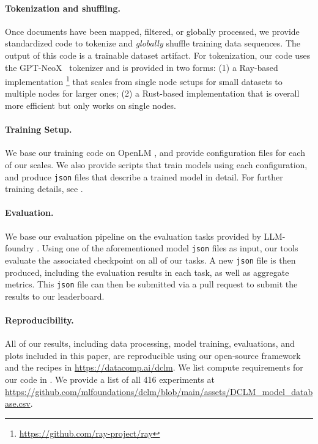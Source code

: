 \documentclass{article}
\newcommand{\numbaseline}{416}
\newcommand{\ourcode}{\url{https://datacomp.ai/dclm}\xspace}
\begin{document}
\paragraph{Tokenization and shuffling.}
Once documents have been mapped, filtered, or globally processed, we provide standardized code to tokenize and \textit{globally} shuffle training data sequences.
The output of this code is a trainable dataset artifact.
For tokenization, our code uses the GPT-NeoX~\citep{neox} tokenizer and is provided in two forms: (1) a Ray-based implementation \footnote{\url{https://github.com/ray-project/ray}} that scales from single node setups for small datasets to multiple nodes for larger ones; (2) a Rust-based implementation that is overall more efficient but only works on single nodes.

\paragraph{Training Setup.} We base our training code on OpenLM \citep{open_lm}, and provide configuration files for each of our scales.
We also provide scripts that train models using each configuration, and produce \texttt{json} files that describe a trained model in detail.
For further training details, see .

\paragraph{Evaluation.} We base our evaluation pipeline on the evaluation tasks provided by LLM-foundry \citep{mosailMLarithmetic}.
Using one of the aforementioned model \texttt{json} files as input, our tools evaluate the associated checkpoint on all of our tasks.
A new \texttt{json} file is then produced, including the evaluation results in each task, as well as aggregate metrics.
This \texttt{json} file can then be submitted via a pull request to submit the results to our leaderboard.

\paragraph{Reproducibility.} All of our results, including data processing, model training, evaluations, and plots included in this paper, are reproducible using our open-source framework and the recipes in \ourcode. We list compute requirements for our code in . We provide a list of all \numbaseline{} experiments at \url{https://github.com/mlfoundations/dclm/blob/main/assets/DCLM_model_database.csv}.
\end{document}
